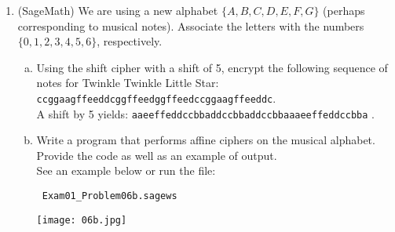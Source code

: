 \documentclass[12pt]{amsart}
\theoremstyle{plain}
\theoremstyle{definition}
\begin{document}
\begin{enumerate}[1.]
\begin{enumerate}[a.]
		\end{enumerate}
	 \item (SageMath) We are using a new alphabet $\{A,B,C,D,E,F,G\}$ (perhaps corresponding to musical notes).  Associate the letters with the numbers $\{0,1,2,3,4,5,6\}$, respectively.\\
		\begin{enumerate}[a.]
			\item Using the shift cipher with a shift of 5, encrypt the following sequence of notes for Twinkle Twinkle Little Star: \texttt{ccggaagffeeddcggffeedggffeedccggaagffeeddc}.\\
			
			A shift by 5 yields: \texttt{aaeeffeddccbbaddccbbaddccbbaaaeeffeddccbba}	.\\
			
			\item Write a program that performs affine ciphers on the musical alphabet.  Provide the code as well as an example of output.\\

			See an example below or run the file: \begin{verbatim} Exam01_Problem06b.sagews
			\end{verbatim}
			
			\begin{framed}
			\texttt{[image: 06b.jpg]}
			\end{framed}
			
		\end{enumerate}
\end{enumerate}

	
\end{document}
